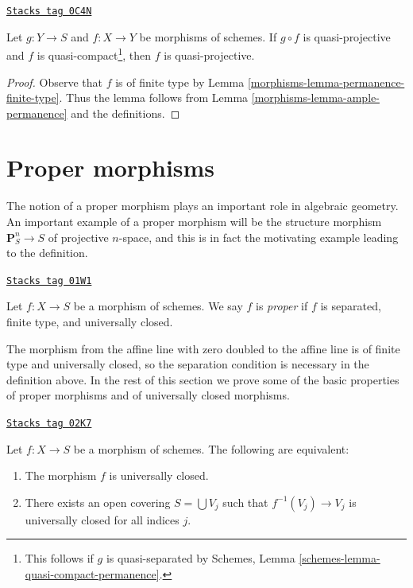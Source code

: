 \begin{lemma}
\label{morphisms-lemma-quasi-projective-permanence}
\href{https://stacks.math.columbia.edu/tag/0C4N}{\texttt{Stacks tag 0C4N}}

Let $g : Y \to S$ and $f : X \to Y$ be morphisms of schemes.
If $g \circ f$ is quasi-projective and $f$ is
quasi-compact\footnote{This follows if $g$ is quasi-separated by
Schemes, Lemma \ref{schemes-lemma-quasi-compact-permanence}.},
then $f$ is quasi-projective.
\end{lemma}

\begin{proof}

Observe that $f$ is of finite type by
Lemma \ref{morphisms-lemma-permanence-finite-type}.
Thus the lemma follows from Lemma \ref{morphisms-lemma-ample-permanence}
and the definitions.
\end{proof}

\section{Proper morphisms}
\label{morphisms-section-proper}
The notion of a proper morphism plays an important role in algebraic
geometry. An important example of a proper morphism will be the
structure morphism $\mathbf{P}^n_S \to S$ of projective $n$-space,
and this is in fact the motivating example leading to the definition.

\begin{definition}[Proper]
\label{morphisms-definition-proper}
\href{https://stacks.math.columbia.edu/tag/01W1}{\texttt{Stacks tag 01W1}}

Let $f : X \to S$ be a morphism of schemes.
We say $f$ is {\it proper} if $f$ is separated, finite type, and
universally closed.
\end{definition}

The morphism from the affine line with zero doubled to the affine line
is of finite type and universally closed, so the separation condition is
necessary in the definition above.
In the rest of this section we prove some of the basic properties
of proper morphisms and of universally closed morphisms.

\begin{lemma}
\label{morphisms-lemma-universally-closed-local-on-the-base}
\href{https://stacks.math.columbia.edu/tag/02K7}{\texttt{Stacks tag 02K7}}

Let $f : X \to S$ be a morphism of schemes.
The following are equivalent:
\begin{enumerate}
\item The morphism $f$ is universally closed.
\item There exists an open covering $S = \bigcup V_j$ such
that $f^{-1}(V_j) \to V_j$ is universally closed for all indices $j$.
\end{enumerate}
\end{lemma}

